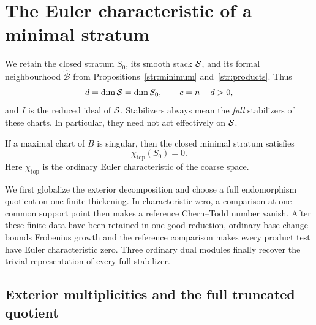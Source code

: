 \section{The Euler characteristic of a minimal stratum}
\label{eu:section}\label{sec:euler}

We retain the closed stratum $S_0$, its smooth stack $\mathcal S$, and its
formal neighbourhood $\widehat{\mathcal B}$ from
Propositions~\ref{str:minimum} and~\ref{str:products}.  Thus
\[
 d=\dim\mathcal S=\dim S_0,\qquad c=n-d>0,
\]
and $I$ is the reduced ideal of $\mathcal S$.  Stabilizers always mean the
\emph{full} stabilizers of these charts.  In particular, they need not act
effectively on $\mathcal S$.

\begin{proposition}\label{eu:euler-zero}
If a maximal chart of $B$ is singular, then the closed minimal stratum
satisfies
\[
                 \chi_{\mathrm{top}}(S_0)=0.
\]
Here $\chi_{\mathrm{top}}$ is the ordinary Euler characteristic of the coarse
space.
\end{proposition}

We first globalize the exterior decomposition and choose a full
endomorphism quotient on one finite thickening.  In characteristic zero,
a comparison at one common support point then makes a reference
Chern--Todd number vanish.  After these finite data have been retained in
one good reduction, ordinary base change bounds Frobenius growth and
the reference comparison makes every product test have Euler
characteristic zero.  Three ordinary dual modules finally recover the
trivial representation of every full stabilizer.

\subsection{Exterior multiplicities and the full truncated quotient}

